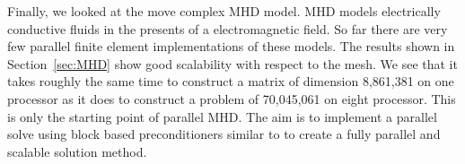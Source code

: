 \documentclass[11pt]{article}
\begin{document}
Finally, we looked at the move complex MHD model. MHD models electrically conductive fluids in the presents of a electromagnetic field. So far there are very few parallel finite element implementations of these models. The results shown in Section~\ref{sec:MHD} show good scalability with respect to the mesh. We see that it takes roughly the same time to construct a matrix of dimension 8,861,381 on one processor as it does to construct a problem of 70,045,061 on eight processor. This is only the starting point of parallel MHD. The aim is to implement a parallel solve using block based preconditioners similar to \cite{phillips2014block,mythesis} to create a fully parallel and scalable solution method.





\end{document}
